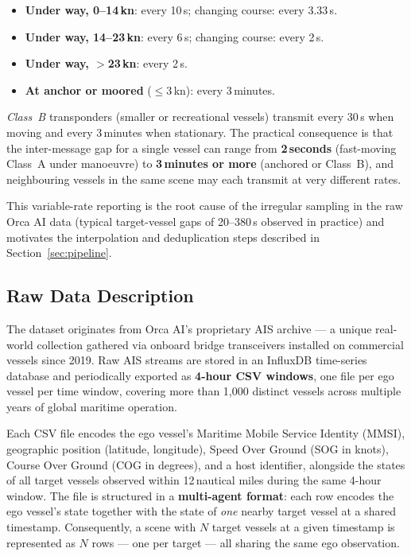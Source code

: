 \documentclass[12pt, a4paper]{article}
\begin{document}
  \begin{itemize}
      \item \textbf{Under way, 0--14\,kn}: every 10\,s; changing course: every 3.33\,s.
      \item \textbf{Under way, 14--23\,kn}: every 6\,s; changing course: every 2\,s.
      \item \textbf{Under way, $>$23\,kn}: every 2\,s.
      \item \textbf{At anchor or moored} ($\leq$3\,kn): every 3\,minutes.
  \end{itemize}

  \textit{Class~B} transponders (smaller or recreational vessels) transmit every 30\,s
  when moving and every 3\,minutes when stationary.  The practical consequence is that
  the inter-message gap for a single vessel can range from \textbf{2\,seconds}
  (fast-moving Class~A under manoeuvre) to \textbf{3\,minutes or more}
  (anchored or Class~B), and neighbouring vessels in the same scene may each transmit at
  very different rates.

  This variable-rate reporting is the root cause of the irregular sampling in the raw
  Orca AI data (typical target-vessel gaps of 20--380\,s observed in practice) and
  motivates the interpolation and deduplication steps described in
  Section~\ref{sec:pipeline}.

  \subsection{Raw Data Description}

  The dataset originates from Orca AI's proprietary AIS archive — a unique real-world collection
  gathered via onboard bridge transceivers installed on commercial vessels since 2019.
  Raw AIS streams are stored in an InfluxDB time-series database and periodically exported as
  \textbf{4-hour CSV windows}, one file per ego vessel per time window, covering more than
  1{,}000 distinct vessels across multiple years of global maritime operation.

  Each CSV file encodes the ego vessel's Maritime Mobile Service Identity (MMSI), geographic
  position (latitude, longitude), Speed Over Ground (SOG in knots), Course Over Ground
  (COG in degrees), and a host identifier, alongside the states of all target vessels observed
  within 12\,nautical miles during the same 4-hour window.
  The file is structured in a \textbf{multi-agent format}: each row encodes the ego vessel's
  state together with the state of \emph{one} nearby target vessel at a shared timestamp.
  Consequently, a scene with $N$ target vessels at a given timestamp is represented as $N$ rows
  — one per target — all sharing the same ego observation.
\end{document}
